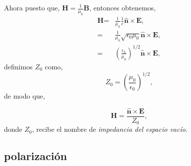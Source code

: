 \documentclass[11pt,fleqn]{book} %
\begin{document}
Ahora puesto que, $\textbf{H}=\frac{1}{\mu_0}\textbf{B}$, entonces obtenemos,
 \begin{equation*}
 \begin{split}
\textbf{H}=&\frac{1}{\mu_0}\frac{1}{c}\hat{\textbf{n}}\times\textbf{E},\\
=&\frac{1}{\mu_0}\sqrt{\epsilon_0\mu_0}\hat{\textbf{n}}\times\textbf{E},\\
=&\left( \frac{\epsilon_0}{\mu_0} \right)^{1/2}\hat{\textbf{n}}\times\textbf{E},
 \end{split}
 \end{equation*}
definimos $Z_0$ como,
\begin{equation}
Z_0=\left( \frac{\mu_0}{\epsilon_0} \right)^{1/2},
\end{equation}
de modo que,

\begin{equation}
\textbf{H}=\frac{\hat{\textbf{n}}\times\textbf{E}}{Z_0},  \label{H_z}
\end{equation}
donde $Z_0$, recibe el nombre de \textit{impedancia del espacio vac\'io}.
\subsection{polarizaci\'on}
\end{document}
